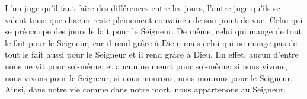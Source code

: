 L’un juge qu’il faut faire des différences entre les jours,
	l’autre juge qu’ils se valent tous:
	que chacun reste pleinement convaincu de son point de vue.
Celui qui se préoccupe des jours le fait pour le Seigneur.
	De même, celui qui mange de tout le fait pour le Seigneur,
		car il rend grâce à Dieu;
	mais celui qui ne mange pas de tout le fait aussi pour le Seigneur
		et il rend grâce à Dieu.
En effet, aucun d’entre nous ne vit pour soi-même,
	et aucun ne meurt pour soi-même:
	si nous vivons, nous vivons pour le Seigneur;
	si nous mourons, nous mourons pour le Seigneur.
Ainsi, dans notre vie comme dans notre mort, nous appartenons au Seigneur.
